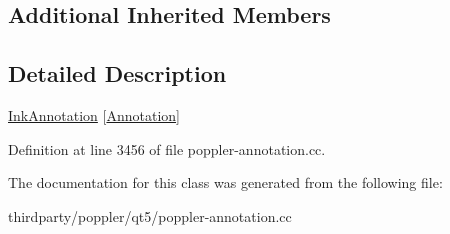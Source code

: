 \subsection*{Additional Inherited Members}


\subsection{Detailed Description}
\hyperlink{class_poppler_1_1_ink_annotation}{Ink\+Annotation} \mbox{[}\hyperlink{class_poppler_1_1_annotation}{Annotation}\mbox{]} 

Definition at line 3456 of file poppler-\/annotation.\+cc.



The documentation for this class was generated from the following file\+:\begin{DoxyCompactItemize}
\item 
thirdparty/poppler/qt5/poppler-\/annotation.\+cc\end{DoxyCompactItemize}
